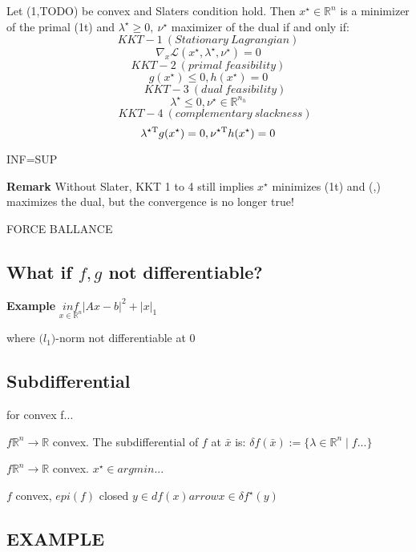 \begin{theorem}
	Let (1,TODO) be convex and Slaters condition hold.
	Then $x^\star \in \mathbb{R}^{n}$ is a minimizer of the primal (1t)
	and $\lambda^\star \ge 0,\ \nu^\star$ maximizer of the dual
	if and only if:
	$$ KKT-1\ (Stationary\ Lagrangian)                                         $$
	$$ \nabla_x\mathcal{L}(x^\star,\lambda^\star,\nu^\star)=0                 $$
	$$ KKT-2\ (primal\ feasibility)                                           $$
	$$ g(x^\star)\le0, h(x^\star)=0                                           $$
	$$ \quad\ KKT-3\ (dual\ feasibility)                                      $$
	$$ \lambda^\star\le0, \nu^\star \in \mathbb{R}^{n_h}                      $$
	$$ \quad\ KKT-4\ (complementary\ slackness)                               $$
	$$ \lambda^{\star\textnormal{\scriptsize T}}g(x^\star)=0, \nu^{\star\textnormal{\scriptsize T}} h(x^\star)=0     $$
\end{theorem}

INF=SUP

\textbf{Remark} Without Slater, KKT 1 to 4 still implies $x^\star$ minimizes (1t)
and (\lambda,\nu) maximizes the dual,
but the convergence is no longer true!

FORCE BALLANCE

\subsection{What if $f, g$ not differentiable?}

\textbf{Example} $\underset{x \in \mathcal{\mathbb{R}}^n}{inf}|Ax -b|^2 + |x|_1$

where $\mathcal(l_1)$-norm not  differentiable at 0

\subsection{Subdifferential}

for  convex  f...

\begin{definition}
	$f \mathbb{R}^{n} \rightarrow \mathbb{R}$ convex.
	The subdifferential of $f$ at $\bar{x}$ is:
	$\delta f(\bar{x}):= \{\lambda \in \mathbb{R}^{n} \mid f... \}$
\end{definition}

\begin{proposition}[]
	$f \mathbb{R}^{n} \rightarrow \mathbb{R}$ convex.
	$x^\star \in argmin...$
\end{proposition}

\begin{proposition}[]
	$f$ convex, $epi(f)$ closed
	$y \in df(x) arrow x \in \delta f^\star(y)$
\end{proposition}

\subsection{EXAMPLE}


